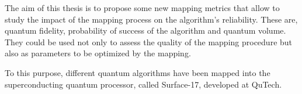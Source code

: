  



The aim of this thesis is to propose some new mapping metrics that allow to study the impact of the mapping process on the algorithm's reliability. These are, quantum fidelity, probability of success of the algorithm and quantum volume. They could be used not only  to assess the quality of the mapping procedure but also as parameters to be optimized by the mapping.

To this purpose, different quantum algorithms have been mapped into the superconducting quantum processor, called Surface-17, developed at QuTech.  




\begin{comment}
\begin{flushright}
{\makeatletter\itshape
    \@author \\
    Delft, February 2019
\makeatother}
\end{flushright}
\end{comment}
